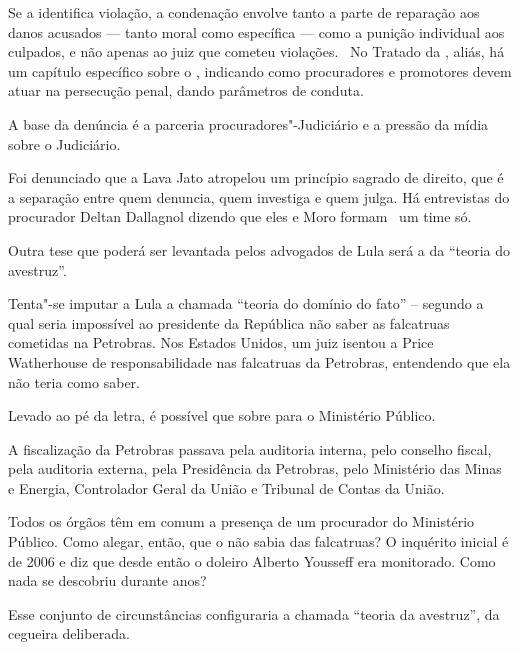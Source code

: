 Se a  identifica violação, a condenação envolve tanto a parte de
reparação aos danos acusados --- tanto moral como específica --- como a
punição individual aos culpados, e não apenas ao juiz que cometeu
violações. ~No Tratado da , aliás, há um capítulo específico sobre o
, indicando como procuradores e promotores devem atuar na persecução
penal, dando parâmetros de conduta.

A base da denúncia é a parceria procuradores"-Judiciário e a pressão da
mídia sobre o Judiciário.

Foi denunciado que a Lava Jato atropelou um princípio sagrado de
direito, que é a separação entre quem denuncia, quem investiga e quem
julga. Há entrevistas do procurador Deltan Dallagnol dizendo que eles e
Moro formam ~um time só.

Outra tese que poderá ser levantada pelos advogados de Lula será a da
``teoria do avestruz''.

Tenta"-se imputar a Lula a chamada ``teoria do domínio do fato'' --
segundo a qual seria impossível ao presidente da República não saber as
falcatruas cometidas na Petrobras. Nos Estados Unidos, um juiz isentou a
Price Watherhouse de responsabilidade nas falcatruas da Petrobras,
entendendo que ela não teria como saber.

Levado ao pé da letra, é possível que sobre para o Ministério Público.

A fiscalização da Petrobras passava pela auditoria interna, pelo
conselho fiscal, pela auditoria externa, pela Presidência da Petrobras,
pelo Ministério das Minas e Energia, Controlador Geral da União e
Tribunal de Contas da União.

Todos os órgãos têm em comum a presença de um procurador do Ministério
Público. Como alegar, então, que o  não sabia das falcatruas? O
inquérito inicial é de 2006 e diz que desde então o doleiro Alberto
Yousseff era monitorado. Como nada se descobriu durante anos?

Esse conjunto de circunstâncias configuraria a chamada ``teoria da
avestruz'', da cegueira deliberada.
